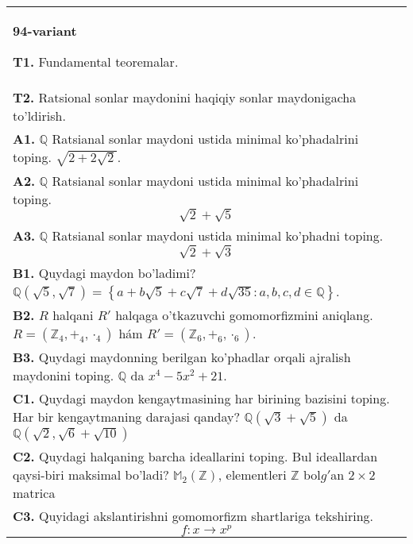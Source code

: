 \documentclass{article}
\begin{document}
\begin{tabular}{m{17cm}}
\textbf{94-variant}
\newline

\textbf{T1.} Fundamental teoremalar. \\
\textbf{T2.} Ratsional sonlar maydonini haqiqiy sonlar maydonigacha to'ldirish. \\
\textbf{A1.} \(\mathbb{Q}\) Ratsianal sonlar maydoni ustida minimal ko'phadalrini toping.
\(\sqrt{2 + 2\sqrt{2}}\). \\
\textbf{A2.} \(\mathbb{Q}\) Ratsianal sonlar maydoni ustida minimal ko'phadalrini toping.
\[\sqrt{2} + \sqrt{5}\] \\
\textbf{A3.} \(\mathbb{Q}\) Ratsianal sonlar maydoni ustida minimal ko'phadni toping.
\[\sqrt{2} + \sqrt{3}\] \\
\textbf{B1.} Quydagi maydon bo'ladimi?
\(\mathbb{Q}\left( \sqrt{5},\sqrt{7} \right) = \left\{ a + b\sqrt{5} + c\sqrt{7} + d\sqrt{35}:a,b,c,d \in \mathbb{Q} \right\}\). \\
\textbf{B2.} \(R\) halqani \(R'\) halqaga o'tkazuvchi gomomorfizmini aniqlang.
\(R = (\mathbb{Z}_{4}, +_{4}, \cdot_{4})\) hám \(R' = (\mathbb{Z}_{6}, +_{6}, \cdot_{6})\). \\
\textbf{B3.} Quydagi maydonning berilgan ko'phadlar orqali ajralish maydonini toping.
\(\mathbb{Q}\) da \(x^{4} - 5x^{2} + 21\). \\
\textbf{C1.} Quydagi maydon kengaytmasining har birining bazisini toping. Har bir kengaytmaning darajasi qanday?
\(\mathbb{Q}\left( \sqrt{3} + \sqrt{5} \right)\) da \(\mathbb{Q}\left( \sqrt{2},\sqrt{6} + \sqrt{10} \right)\) \\
\textbf{C2.} Quydagi halqaning barcha ideallarini toping. Bul ideallardan qaysi-biri maksimal bo'ladi?
\(\mathbb{M}_{2}\left( \mathbb{Z} \right)\), elementleri \(\mathbb{Z}\) bol\(g'\)an \(2 \times 2\) matrica \\
\textbf{C3.} Quyidagi akslantirishni gomomorfizm shartlariga tekshiring.
\[f:x \rightarrow x^{p}\] \\

\end{tabular}
\vspace{1cm}
\end{document}
